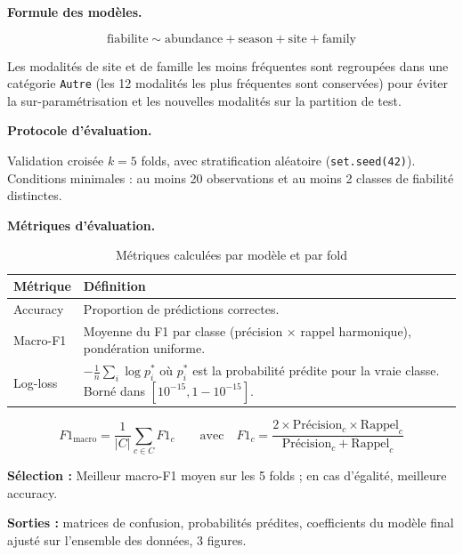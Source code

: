 \documentclass[11pt,a4paper]{article}
\begin{document}
\medskip
\noindent\textbf{Formule des modèles.}\par

\[
  \text{fiabilite} \sim \text{abundance} + \text{season} + \text{site} + \text{family}
\]

Les modalités de site et de famille les moins fréquentes sont regroupées dans une catégorie
\texttt{Autre} (les 12 modalités les plus fréquentes sont conservées) pour éviter la
sur-paramétrisation et les nouvelles modalités sur la partition de test.

\medskip
\noindent\textbf{Protocole d'évaluation.}\par

Validation croisée $k = 5$ folds, avec stratification aléatoire (\texttt{set.seed(42)}).
Conditions minimales : au moins 20 observations et au moins 2 classes de fiabilité distinctes.

\medskip
\noindent\textbf{Métriques d'évaluation.}\par

\begin{table}[htbp]
  \centering
  \caption{Métriques calculées par modèle et par fold}
  \begin{tabularx}{\textwidth}{lX}
    \toprule
    \textbf{Métrique} & \textbf{Définition} \\
    \midrule
    Accuracy & Proportion de prédictions correctes. \\
    Macro-F1 & Moyenne du F1 par classe (précision × rappel harmonique), pondération uniforme. \\
    Log-loss & $-\frac{1}{n}\sum_{i}\log p_i^*$ où $p_i^*$ est la probabilité prédite pour la vraie classe. Borné dans $[10^{-15}, 1-10^{-15}]$. \\
    \bottomrule
  \end{tabularx}
\end{table}

\begin{formulebox}[Macro-F1]
  \[
    F1_{\text{macro}} = \frac{1}{|C|}\sum_{c \in C} F1_c
    \qquad \text{avec} \quad
    F1_c = \frac{2 \times \text{Précision}_c \times \text{Rappel}_c}{\text{Précision}_c + \text{Rappel}_c}
  \]
\end{formulebox}

\textbf{Sélection :} Meilleur macro-F1 moyen sur les 5 folds ; en cas d'égalité, meilleure accuracy.

\textbf{Sorties :} matrices de confusion, probabilités prédites, coefficients du modèle final
ajusté sur l'ensemble des données, 3 figures.
\end{document}
